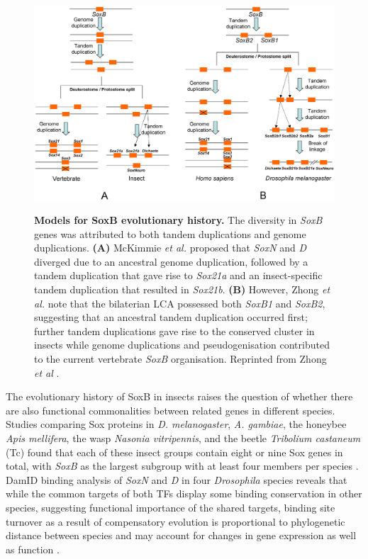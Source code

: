 \documentclass[withindex,glossary]{cam-thesis}
\begin{document}
\setcounter{figure}{3-1}
\begin{figure}[htb]
\centering
\includegraphics[width=\textwidth]{figs/Figure 3 Zhong vs McKimmie.png}
\label{fig3}
\caption{\textbf{Models for SoxB evolutionary history.} The diversity in \emph{SoxB} genes was attributed to both tandem duplications and genome duplications. \textbf{(A)} McKimmie \emph{et al.} \protect\citeyear{mckimmie_conserved_2005} proposed that \emph{SoxN} and \emph{D} diverged due to an ancestral genome duplication, followed by a tandem duplication that gave rise to \emph{Sox21a} and an insect-specific tandem duplication that resulted in \emph{Sox21b}. \textbf{(B)} However, Zhong \emph{et al.} note that the bilaterian LCA possessed both \emph{SoxB1} and \emph{SoxB2}, suggesting that an ancestral tandem duplication occurred first; further tandem duplications gave rise to the conserved cluster in insects while genome duplications and pseudogenisation contributed to the current vertebrate \emph{SoxB} organisation. Reprinted from Zhong \emph{et al} \protect\citeyear{zhong_parallel_2011}.}
\end{figure}

The evolutionary history of SoxB in insects raises the question of
whether there are also functional commonalities between related genes in
different species. Studies comparing Sox proteins in \emph{D.
melanogaster}, \emph{A. gambiae}, the honeybee \emph{Apis mellifera},
the wasp \emph{Nasonia vitripennis}, and the beetle \emph{Tribolium
castaneum} (\gls{Tc}) found that each of these insect groups contain eight or
nine Sox genes in total, with \emph{SoxB} as the largest subgroup with
at least four members per species . DamID
binding analysis of \emph{SoxN} and \emph{D} in four \emph{Drosophila}
species reveals that while the common targets of both TFs display some
binding conservation in other species, suggesting functional importance
of the shared targets, binding site turnover as a result of compensatory
evolution is proportional to phylogenetic distance between species and
may account for changes in gene expression as well as function .
\end{document}
